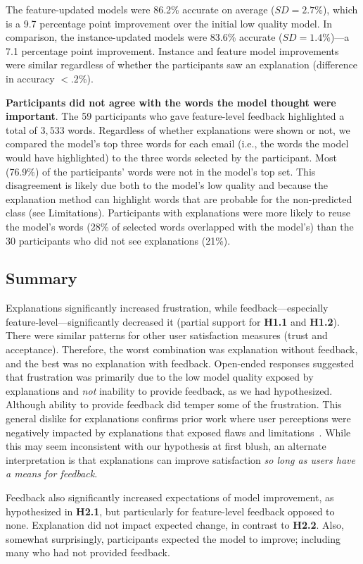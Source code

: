 The feature-updated models were 86.2\% accurate on average ($SD=2.7\%$), which is a 9.7 percentage point improvement over the initial low quality model.
In comparison, the instance-updated models were 83.6\% accurate ($SD=1.4\%$)---a 7.1 percentage point improvement. Instance and feature model improvements were similar regardless of whether the participants saw an explanation (difference in accuracy $<.2\%$).

\textbf{Participants did not agree with the words the model thought were important}.
The 59 participants who gave feature-level feedback highlighted a total of $3,533$ words. Regardless of whether explanations were shown or not, we compared the model's top three words for each email (i.e., the words the model would have highlighted) to the three words selected by the participant. Most (76.9\%) of the participants' words were not in the model's top set. This disagreement is likely due both to the model's low quality and because the explanation method can highlight words that are probable for the non-predicted class (see Limitations). Participants with explanations were more likely to reuse the model's words (28\% of selected words overlapped with the model's) than the 30 participants who did not see explanations (21\%).  

\subsection{Summary}
Explanations significantly increased frustration, while feedback---especially feature-level---significantly decreased it (partial support for \textbf{H1.1} and \textbf{H1.2}). There were similar patterns for other user satisfaction measures (trust and acceptance). Therefore, the worst combination was explanation without feedback, and the best was no explanation with feedback. Open-ended responses suggested that frustration was primarily due to the low model quality exposed by explanations and \textit{not} inability to provide feedback, as we had hypothesized. Although ability to provide feedback did temper some of the frustration. This general dislike for explanations confirms prior work where user perceptions were negatively impacted by explanations that exposed flaws and limitations~\cite{Cai2019TheInterface}. While this may seem inconsistent with our hypothesis at first blush, an alternate interpretation is that explanations can improve satisfaction \emph{so long as users have a means for feedback}. 

Feedback also significantly increased expectations of model improvement, as hypothesized in \textbf{H2.1}, but particularly for feature-level feedback opposed to none. Explanation did not impact expected change, in contrast to \textbf{H2.2}.
Also, somewhat surprisingly, participants  expected the model to improve; including many who had not provided feedback. %
